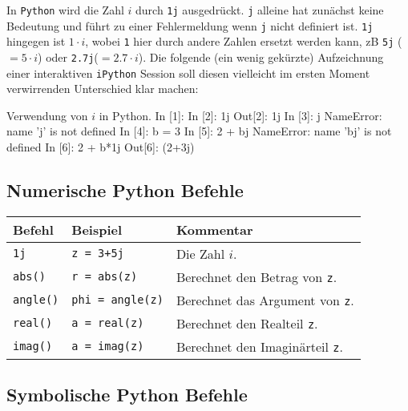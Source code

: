 In \texttt{Python} wird die Zahl $i$ durch \texttt{1j} ausgedrückt. \texttt{j} alleine hat zunächst keine Bedeutung und führt zu einer Fehlermeldung wenn \texttt{j} nicht definiert ist. \texttt{1j} hingegen ist $1\cdot i$, wobei \texttt{1} hier durch andere Zahlen ersetzt werden kann, zB \texttt{5j} ($=5\cdot i$) oder \texttt{2.7j}($=2.7 \cdot i$). Die folgende (ein wenig gekürzte) Aufzeichnung einer interaktiven \texttt{iPython} Session soll diesen vielleicht im ersten Moment verwirrenden Unterschied klar machen:

\begin{python}{Verwendung von $i$ in Python.}
In [1]: %
In [2]: 1j
Out[2]: 1j
In [3]: j
NameError: name 'j' is not defined
In [4]: b = 3
In [5]: 2 + bj
NameError: name 'bj' is not defined
In [6]: 2 + b*1j
Out[6]: (2+3j)
\end{python}


\subsection*{Numerische Python Befehle}
\begin{table}[H]
    \centering
    \begin{tabular}{|p{3cm}|p{6cm}|p{6cm}|}
        \hline
    \textbf{Befehl} & \textbf{Beispiel} & \textbf{Kommentar} \\ \hline
    
    \texttt{1j} & \texttt{z = 3+5j} & Die Zahl $i$. \\ \hline
    \texttt{abs()} & \texttt{r = abs(z)} & Berechnet den Betrag von \texttt{z}. \\ \hline
    \texttt{angle()} & \texttt{phi = angle(z)} & Berechnet das Argument von \texttt{z}. \\ \hline
    \texttt{real()} & \texttt{a = real(z)} & Berechnet den Realteil \texttt{z}. \\ \hline
    \texttt{imag()} & \texttt{a = imag(z)} & Berechnet den Imaginärteil \texttt{z}. \\ \hline

    \end{tabular}
\end{table}

\subsection*{Symbolische Python Befehle}

